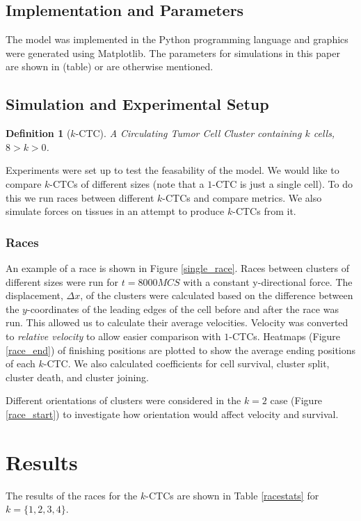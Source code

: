 \documentclass[12pt]{article}
\newtheorem{definition}{Definition}
\begin{document}
\subsection{Implementation and Parameters}
The model was implemented in the Python programming language and graphics were generated using Matplotlib\cite{matplotlib}. The parameters for simulations in this paper are shown in (table) or are otherwise mentioned. %

\subsection{Simulation and Experimental Setup}
\begin{definition}[$k$-CTC]
A Circulating Tumor Cell Cluster containing $k$ cells, $8>k>0$.
\end{definition}

Experiments were set up to test the feasability of the model. We would like to compare $k$-CTCs of different sizes (note that a $1$-CTC is just a single cell). To do this we run races between different $k$-CTCs and compare metrics. We also simulate forces on tissues in an attempt to produce $k$-CTCs from it.

\subsubsection{Races}
An example of a race is shown in  Figure \ref{single_race}. Races between clusters of different sizes were run for $t=8000MCS$ with a constant y-directional force. The displacement, $\Delta x$, of the clusters were calculated based on the difference between the $y$-coordinates of the leading edges of the cell before and after the race was run. This allowed us to calculate their average velocities. Velocity was converted to \emph{relative velocity} to allow easier comparison with $1$-CTCs. Heatmaps (Figure \ref{race_end}) of finishing positions are plotted to show the average ending positions of each $k$-CTC. We also calculated coefficients for cell survival, cluster split, cluster death, and cluster joining. 

Different orientations of clusters were considered in the $k=2$ case (Figure \ref{race_start}) to investigate how orientation would affect velocity and survival.



\section{Results}
The results of the races for the $k$-CTCs are shown in Table \ref{racestats} for $k=\{1,2,3,4\}$.
\end{document}
